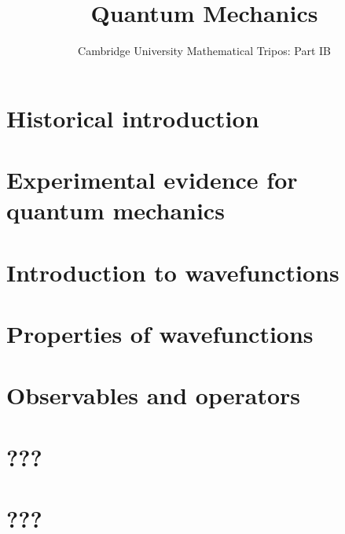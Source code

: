\documentclass{article}
\title{Quantum Mechanics}
\author{Cambridge University Mathematical Tripos: Part IB}
\begin{document}
\maketitle

\tableofcontentsnewpage{}

\section{Historical introduction}

\section{Experimental evidence for quantum mechanics}

\section{Introduction to wavefunctions}

\section{Properties of wavefunctions}

\section{Observables and operators}

\section{???}

\section{???}

\end{document}
